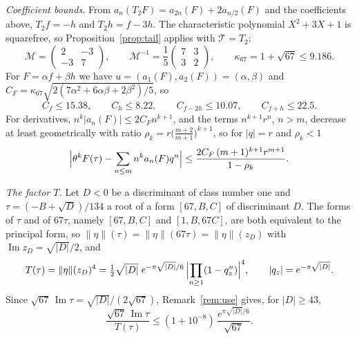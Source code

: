\documentclass[11pt]{amsart}
\theoremstyle{definition}
\theoremstyle{remark}
\newcommand{\im}{\operatorname{Im}}
\newcommand{\etanorm}[1]{\lVert\eta\rVert(#1)}
\begin{document}
\emph{Coefficient bounds.}  From $a_n(T_2F)=a_{2n}(F)+2a_{n/2}(F)$ and the
coefficients above, $T_2f=-h$ and $T_2h=f-3h$.  The characteristic polynomial
$X^2+3X+1$ is squarefree, so Proposition~\ref{prop:tail} applies with
$\mathcal T=T_2$:
\[
\mathcal M=\begin{pmatrix}2&-3\\-3&7\end{pmatrix},\qquad
\mathcal M^{-1}=\frac15\begin{pmatrix}7&3\\3&2\end{pmatrix},\qquad
\kappa_{67}=1+\sqrt{67}\le9.186 .
\]
For $F=\alpha f+\beta h$ we have $u=(a_1(F),a_2(F))=(\alpha,\beta)$ and
$C_F=\kappa_{67}\sqrt{2(7\alpha^2+6\alpha\beta+2\beta^2)/5}$, so
\[
C_f\le15.38,\qquad C_h\le8.22,\qquad C_{f-2h}\le10.07,\qquad C_{f+h}\le22.5 .
\]
For derivatives, $n^k\lvert a_n(F)\rvert\le2C_Fn^{k+1}$, and the terms
$n^{k+1}r^n$, $n>m$, decrease at least geometrically with ratio
$\rho_k=r\bigl(\tfrac{m+2}{m+1}\bigr)^{k+1}$, so for $\lvert q\rvert=r$ and $\rho_k<1$
\begin{equation}\label{eq:tail-theta}
\Bigl\lvert\theta^kF(\tau)-\sum_{n\le m}n^ka_n(F)q^n\Bigr\rvert
\le\frac{2C_F\,(m+1)^{k+1}r^{m+1}}{1-\rho_k}.
\end{equation}

\emph{The factor $T$.}  Let $D<0$ be a discriminant of class number one and
$\tau=(-B+\sqrt D)/134$ a root of a form $[67,B,C]$ of discriminant $D$.  The
forms of $\tau$ and of $67\tau$, namely $[67,B,C]$ and $[1,B,67C]$, are both
equivalent to the principal form, so
$\etanorm{\tau}=\etanorm{67\tau}=\etanorm{z_D}$ with
$\im z_D=\sqrt{\lvert D\rvert}/2$, and
\[
T(\tau)=\etanorm{z_D}^4=\tfrac12\sqrt{\lvert D\rvert}\;e^{-\pi\sqrt{\lvert D\rvert}/6}\,
\Bigl\lvert\prod_{n\ge1}(1-q_z^n)\Bigr\rvert^4,
\qquad\lvert q_z\rvert=e^{-\pi\sqrt{\lvert D\rvert}} .
\]  Since
$\sqrt{67}\,\im\tau=\sqrt{\lvert D\rvert}/(2\sqrt{67})$, Remark~\ref{rem:use}
gives, for $\lvert D\rvert\ge43$,
\begin{equation}\label{eq:scale67}
\frac{\sqrt{67}\,\im\tau}{T(\tau)}\le(1+10^{-8})\,\frac{e^{\pi\sqrt{\lvert D\rvert}/6}}{\sqrt{67}} .
\end{equation}
\end{document}
